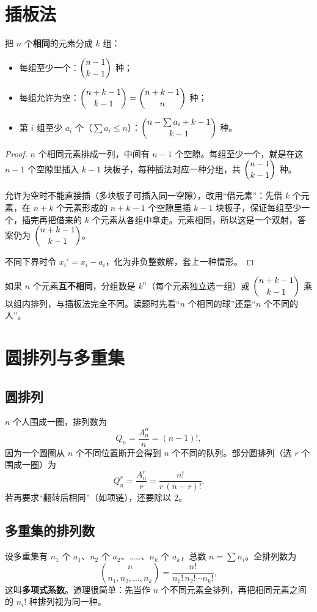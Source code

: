 \section{插板法}
\begin{theorem}[插板法]
把 $n$ 个\textbf{相同}的元素分成 $k$ 组：
\begin{itemize}
\item 每组至少一个：$\dbinom{n-1}{k-1}$ 种；
\item 每组允许为空：$\dbinom{n+k-1}{k-1}=\dbinom{n+k-1}{n}$ 种；
\item 第 $i$ 组至少 $a_i$ 个（$\sum a_i\le n$）：$\dbinom{n-\sum a_i+k-1}{k-1}$ 种。
\end{itemize}
\end{theorem}
\begin{proof}
$n$ 个相同元素排成一列，中间有 $n-1$ 个空隙。每组至少一个，就是在这 $n-1$ 个空隙里插入 $k-1$ 块板子，每种插法对应一种分组，共 $\dbinom{n-1}{k-1}$ 种。

允许为空时不能直接插（多块板子可插入同一空隙），改用“借元素”：先借 $k$ 个元素，在 $n+k$ 个元素形成的 $n+k-1$ 个空隙里插 $k-1$ 块板子，保证每组至少一个，插完再把借来的 $k$ 个元素从各组中拿走。元素相同，所以这是一个双射，答案仍为 $\dbinom{n+k-1}{k-1}$。

不同下界时令 $x_i'=x_i-a_i$，化为非负整数解，套上一种情形。
\end{proof}

\begin{pitfall}
如果 $n$ 个元素\textbf{互不相同}，分组数是 $k^n$（每个元素独立选一组）或 $\dbinom{n+k-1}{k-1}$ 乘以组内排列，与插板法完全不同。读题时先看“$n$ 个相同的球”还是“$n$ 个不同的人”。
\end{pitfall}

\section{圆排列与多重集}
\subsection{圆排列}
$n$ 个人围成一圈，排列数为
\[
Q_n=\frac{A_n^n}{n}=(n-1)!,
\]
因为一个圆圈从 $n$ 个不同位置断开会得到 $n$ 个不同的队列。部分圆排列（选 $r$ 个围成一圈）为
\[
Q_n^r=\frac{A_n^r}{r}=\frac{n!}{r\,(n-r)!}.
\]
若再要求“翻转后相同”（如项链），还要除以 $2$。

\subsection{多重集的排列数}
设多重集有 $n_1$ 个 $a_1$、$n_2$ 个 $a_2$、……、$n_k$ 个 $a_k$，总数 $n=\sum n_i$。全排列数为
\[
\binom{n}{n_1,n_2,\ldots,n_k}=\frac{n!}{n_1!\,n_2!\cdots n_k!},
\]
这叫\textbf{多项式系数}。道理很简单：先当作 $n$ 个不同元素全排列，再把相同元素之间的 $n_i!$ 种排列视为同一种。

